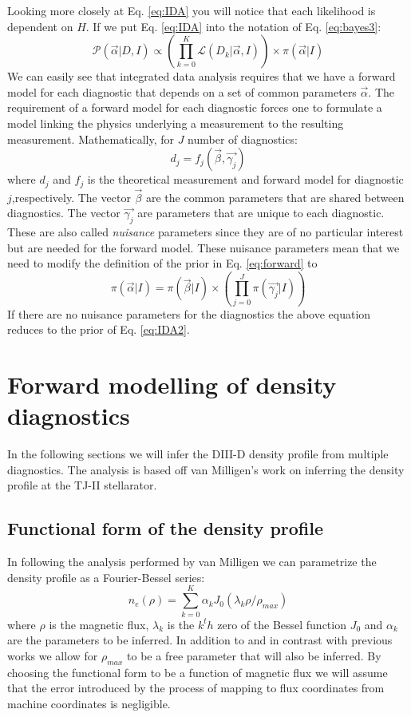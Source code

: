 \documentclass[12pt]{article}
\numberwithin{equation}{section}
\begin{document}
Looking more closely at Eq. \ref{eq:IDA} you will notice that each likelihood is dependent on $H$. 
If we put Eq. \ref{eq:IDA} into the notation of Eq. \ref{eq:bayes3}:
\begin{equation} \label{eq:IDA2}
	  {\mathcal{P}(\vec{\alpha}|D,I)} \propto {\left( \prod\limits_{k=0}^K{\mathcal{L}(D_k|\vec{\alpha},I)} \right)} \times 
	  {\pi(\vec{\alpha}|I)}
\end{equation}
We can easily see that integrated data analysis requires that we have a forward model for each diagnostic that depends on 
a set of common parameters $\vec{\alpha}$. 
The requirement of a forward model for each diagnostic forces one to formulate a model linking the physics underlying a measurement to 
the resulting measurement. Mathematically, for $J$ number of diagnostics:
\begin{equation} \label{eq:forward}
	d_j = f_j(\vec{\beta},\vec{\gamma_j})
\end{equation}
where $d_j$ and $f_j$ is the theoretical measurement and forward model for diagnostic $j$,respectively. The vector $\vec{\beta}$ are the common parameters that are shared between diagnostics. The vector $\vec{\gamma_j}$ are parameters that are unique to each diagnostic. These are also called \emph{nuisance} parameters since they are of no particular interest but are needed for the forward model. These nuisance parameters mean that we need to modify the definition of the prior in Eq. \ref{eq:forward} to 
\begin{equation} \label{eq:forwardprior}
	\pi ( \vec{\alpha} | I ) = \pi ( \vec{\beta}|I) \times \left( \prod \limits_{j=0}^{J} \pi ( \vec{\gamma_j}|I) \right)
\end{equation}
If there are no nuisance parameters for the diagnostics the above equation reduces to the prior of Eq. \ref{eq:IDA2}.
\section{Forward modelling of density diagnostics}
In the following sections we will infer the DIII-D density profile 
from multiple diagnostics. The analysis is based off van Milligen's 
work on inferring the density profile at the TJ-II stellarator.\cite
{van2011integrated} 
\subsection{Functional form of the density profile}
In following the analysis performed by van Milligen we can 
parametrize the density profile as a Fourier-Bessel series:
\begin{equation} \label{eq:densityform}
	n_e(\rho) = \sum\limits_{k=0}^K \alpha_k J_0(\lambda_k \rho/
	\rho_{max})
\end{equation}
where $\rho$ is the magnetic flux, $\lambda_k$ is the $k^th$ zero of 
the Bessel function $J_0$ and $\alpha_k$ are the parameters to be 
inferred. In addition to and in contrast with previous works we allow 
for $\rho_{max}$ to be a free parameter that will also be inferred. By 
choosing the functional form to be a function of magnetic flux we will 
assume that the error introduced by the process of mapping to flux 
coordinates from machine coordinates is negligible.
\end{document}
